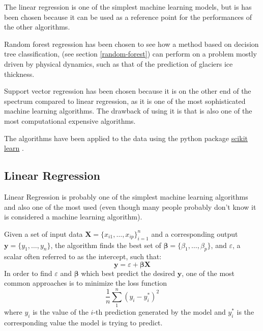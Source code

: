 The linear regression is one of the simplest machine learning models, but is has been chosen because it can be used as a reference point for the performances of the other algorithms.

Random forest regression has been chosen to see how a method based on decision tree classification, (see section \ref{random-forest}) can perform on a problem mostly driven by physical dynamics, such as that of the prediction of glaciers ice thickness. 

Support vector regression has been chosen because it is on the other end of the spectrum compared to linear regression, as it is one of the most sophisticated machine learning algorithms. The drawback of using it is that is also one of the most computational expensive algorithms. 

The algorithms have been applied to the data using the python package \href{https://scikit-learn.org/}{scikit learn} \citep{scikit}.
\subsection{Linear Regression}\label{linearregr}
Linear Regression is probably one of the simplest machine learning algorithms and also one of the most used (even though many people probably don't know it is considered a machine learning algorithm).

Given a set of input data $\bm{X} = \{x_{i1},\ldots ,x_{ip}\}_{i=1}^{n}$ and a corresponding output $\mathbf{y} = \{y_{1},\ldots ,y_{n}\}$, the algorithm finds the best set of $\bm{\beta} = \{\beta_{1},\ldots ,\beta_{p}\}$, and $\varepsilon$, a scalar often referred to as the intercept, such that:
\begin{equation}\label{eq:linear}
\mathbf {y} = \varepsilon + \bm{\beta}\bm{X}
\end{equation}
In order to find $\varepsilon$ and $\bm{\beta}$ which best predict the desired $\mathbf {y}$, one of the most common approaches is to minimize the loss function
\begin{equation}
\frac{1}{n}\sum_{1}^{n}(y_i-y^*_i)^2
\end{equation}
where $y_i$ is the value of the $i$-th prediction generated by the model and $y^*_i$ is the corresponding value the model is trying to predict.

